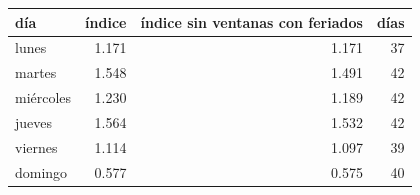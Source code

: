 \begin{tabular}{lrrr}
\toprule
día & índice & índice sin ventanas con feriados & días \\
\midrule
lunes & 1.171 & 1.171 & 37 \\
martes & 1.548 & 1.491 & 42 \\
miércoles & 1.230 & 1.189 & 42 \\
jueves & 1.564 & 1.532 & 42 \\
viernes & 1.114 & 1.097 & 39 \\
domingo & 0.577 & 0.575 & 40 \\
\bottomrule
\end{tabular}